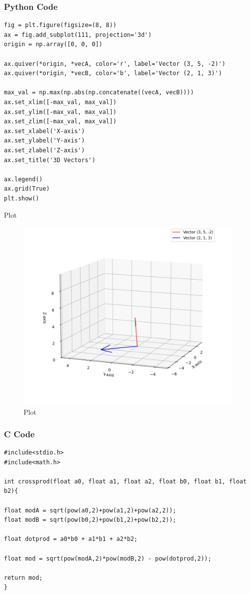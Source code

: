\documentclass{beamer}
\begin{document}
\begin{frame}[fragile]
    \frametitle{Python Code}

    \begin{lstlisting}
fig = plt.figure(figsize=(8, 8))
ax = fig.add_subplot(111, projection='3d')
origin = np.array([0, 0, 0])

ax.quiver(*origin, *vecA, color='r', label='Vector (3, 5, -2)')
ax.quiver(*origin, *vecB, color='b', label='Vector (2, 1, 3)')

max_val = np.max(np.abs(np.concatenate((vecA, vecB))))
ax.set_xlim([-max_val, max_val])
ax.set_ylim([-max_val, max_val])
ax.set_zlim([-max_val, max_val])
ax.set_xlabel('X-axis')
ax.set_ylabel('Y-axis')
ax.set_zlabel('Z-axis')
ax.set_title('3D Vectors')

ax.legend()
ax.grid(True)
plt.show()
    \end{lstlisting}
\end{frame}


\begin{frame}{Plot}
\begin{figure}
    \centering
    \includegraphics[width=0.8\columnwidth]{Figs/Figure_4.png}
    \caption{Plot}
    \label{fig:placeholder}
\end{figure}
\end{frame}


\begin{frame}[fragile]
\frametitle{C Code}
\begin{lstlisting}
#include<stdio.h>
#include<math.h>

int crossprod(float a0, float a1, float a2, float b0, float b1, float b2){

float modA = sqrt(pow(a0,2)+pow(a1,2)+pow(a2,2));
float modB = sqrt(pow(b0,2)+pow(b1,2)+pow(b2,2));

float dotprod = a0*b0 + a1*b1 + a2*b2;

float mod = sqrt(pow(modA,2)*pow(modB,2) - pow(dotprod,2));

return mod;
}
\end{lstlisting}

\end{frame}
\end{document}
